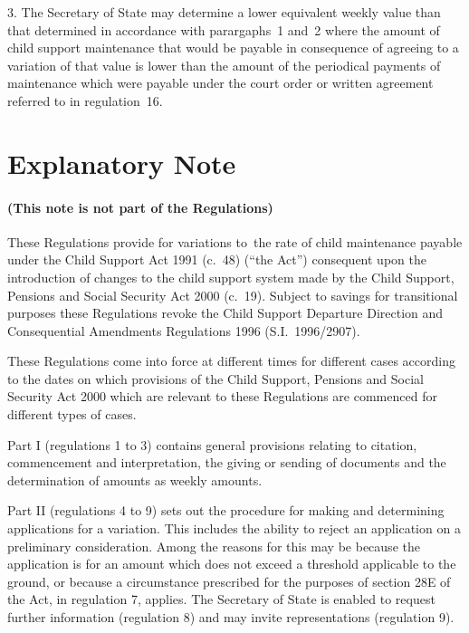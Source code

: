\documentclass[12pt,a4paper]{article}
\begin{document}
\medskip

3.  The Secretary of State may determine a lower equivalent weekly value than that determined in accordance with parargaphs~1 and~2 where the amount of child support maintenance that would be payable in consequence of agreeing to a variation of that value is lower than the amount of the periodical payments of maintenance which were payable under the court order or written agreement referred to in regulation~16. 

\vfill

\part{Explanatory Note}

\renewcommand\parthead{— Explanatory Note}

\subsection*{(This note is not part of the Regulations)}

These Regulations provide for variations to~the rate of child maintenance payable under the Child Support Act 1991 (c.~48) (“the Act”) consequent upon the introduction of changes to the child support system made by the Child Support, Pensions and Social Security Act 2000 (c.~19). Subject to savings for transitional purposes these Regulations revoke the Child Support Departure Direction and Consequential Amendments Regulations 1996 (S.I.~1996/2907).

These Regulations come into force at different times for different cases according to the dates on which provisions of the Child Support, Pensions and Social Security Act 2000 which are relevant to these Regulations are commenced for different types of cases.

Part I (regulations 1 to 3) contains general provisions relating to citation, commencement and interpretation, the giving or sending of documents and the determination of amounts as weekly amounts.

Part II (regulations 4 to 9) sets out the procedure for making and determining applications for a variation. This includes the ability to reject an application on a preliminary consideration. Among the reasons for this may be because the application is for an amount which does not exceed a threshold applicable to the ground, or because a circumstance prescribed for the purposes of section 28E of the Act, in regulation 7, applies. The Secretary of State is enabled to request further information (regulation 8) and may invite representations (regulation 9).
\end{document}
